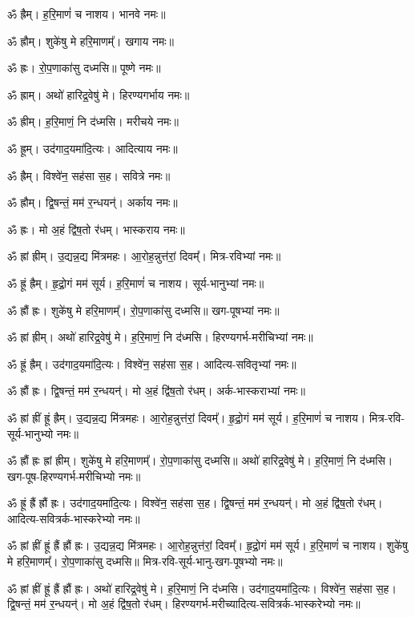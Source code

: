 ॐ ह्रैम्।  ह॒रि॒माणं॑ च नाशय। भानवे नमः॥

ॐ ह्रौम्।  शुके॑षु मे हरि॒माणम्᳚। खगाय नमः॥

ॐ ह्रः। रो॒प॒णाका॑सु दध्मसि॥ पूष्णे नमः॥

ॐ ह्राम्।  अथो॑ हारिद्र॒वेषु॑ मे। हिरण्यगर्भाय नमः॥

ॐ ह्रीम्।  ह॒रि॒माणं॒ नि द॑ध्मसि। मरीचये नमः॥

ॐ ह्रूम्।  उद॑गाद॒यमा॑दि॒त्यः। आदित्याय नमः॥

ॐ ह्रैम्।  विश्वे॑न॒ सह॑सा स॒ह। सवित्रे नमः॥

ॐ ह्रौम्।  द्वि॒षन्तं॒ मम॑ र॒न्धयन्॑। अर्काय नमः॥

ॐ ह्रः। मो अ॒हं द्वि॑ष॒तो र॑धम्। भास्कराय नमः॥


ॐ ह्रां ह्रीम्। उ॒द्यन्न॒द्य मि॑त्रमहः।  आ॒रोह॒न्नुत्त॑रां॒ दिवम्᳚। मित्र-रविभ्यां नमः॥

ॐ ह्रूं ह्रैम्। हृ॒द्रो॒गं मम॑ सूर्य। ह॒रि॒माणं॑ च नाशय। सूर्य-भानुभ्यां नमः॥

ॐ ह्रौं ह्रः। शुके॑षु मे हरि॒माणम्᳚। रो॒प॒णाका॑सु दध्मसि॥ खग-पूषभ्यां नमः॥

ॐ ह्रां ह्रीम्। अथो॑ हारिद्र॒वेषु॑ मे। ह॒रि॒माणं॒ नि द॑ध्मसि। हिरण्यगर्भ-मरीचिभ्यां नमः॥

ॐ ह्रूं ह्रैम्। उद॑गाद॒यमा॑दि॒त्यः। विश्वे॑न॒ सह॑सा स॒ह। आदित्य-सवितृभ्यां नमः॥

ॐ ह्रौं ह्रः। द्वि॒षन्तं॒ मम॑ र॒न्धयन्॑। मो अ॒हं द्वि॑ष॒तो र॑धम्। अर्क-भास्कराभ्यां नमः॥


ॐ ह्रां ह्रीं ह्रूं ह्रैम्। उ॒द्यन्न॒द्य मि॑त्रमहः। आ॒रोह॒न्नुत्त॑रां॒ दिवम्᳚। हृ॒द्रो॒गं मम॑ सूर्य। ह॒रि॒माणं॑ च नाशय। मित्र-रवि-सूर्य-भानुभ्यो नमः॥

ॐ ह्रौं ह्रः ह्रां ह्रीम्। शुके॑षु मे हरि॒माणम्᳚। रो॒प॒णाका॑सु दध्मसि॥ अथो॑ हारिद्र॒वेषु॑ मे। ह॒रि॒माणं॒ नि द॑ध्मसि। खग-पूष-हिरण्यगर्भ-मरीचिभ्यो नमः॥

ॐ ह्रूं ह्रैं ह्रौं ह्रः। उद॑गाद॒यमा॑दि॒त्यः। विश्वे॑न॒ सह॑सा स॒ह। द्वि॒षन्तं॒ मम॑ र॒न्धयन्॑। मो अ॒हं द्वि॑ष॒तो र॑धम्। आदित्य-सवित्रर्क-भास्करेभ्यो नमः॥

ॐ ह्रां ह्रीं ह्रूं ह्रैं ह्रौं ह्रः।
उ॒द्यन्न॒द्य मि॑त्रमहः। आ॒रोह॒न्नुत्त॑रां॒ दिवम्᳚। हृ॒द्रो॒गं मम॑ सूर्य। ह॒रि॒माणं॑ च नाशय। शुके॑षु मे हरि॒माणम्᳚। रो॒प॒णाका॑सु दध्मसि॥ 
मित्र-रवि-सूर्य-भानु-खग-पूषभ्यो नमः॥


ॐ ह्रां ह्रीं ह्रूं ह्रैं ह्रौं ह्रः।
अथो॑ हारिद्र॒वेषु॑ मे। ह॒रि॒माणं॒ नि द॑ध्मसि। उद॑गाद॒यमा॑दि॒त्यः। विश्वे॑न॒ सह॑सा स॒ह। द्वि॒षन्तं॒ मम॑ र॒न्धयन्॑। मो अ॒हं द्वि॑ष॒तो र॑धम्।
हिरण्यगर्भ-मरीच्यादित्य-सवित्रर्क-भास्करेभ्यो नमः॥

